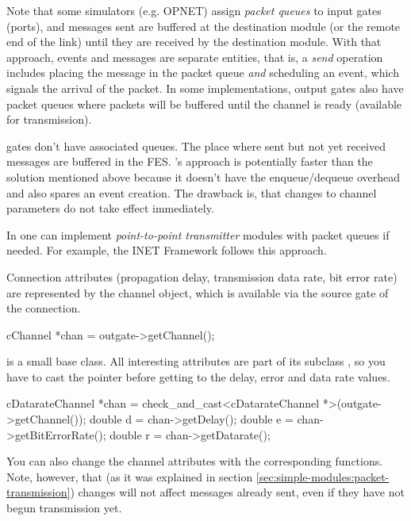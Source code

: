 Note that some simulators (e.g. OPNET) assign \textit{packet queues}
to input gates (ports), and messages sent are buffered at the
destination module (or the remote end of the link) until they are
received by the destination module. With that approach, events and
messages are separate entities, that is, a \textit{send} operation
includes placing the message in the packet queue \textit{and} scheduling
an event, which signals the arrival of the packet. In some implementations,
output gates also have packet queues where packets will be buffered until
the channel is ready (available for transmission).

{\opp} gates don't have associated queues. The place
where sent but not yet received messages are buffered in the
FES.  {\opp}'s approach is potentially faster
than the solution mentioned above because it doesn't have the
enqueue/dequeue overhead and also spares an event creation. The
drawback is, that changes to channel parameters do not take effect
immediately.

In {\opp} one can implement \textit{point-to-point transmitter} modules
with packet queues if needed. For example, the INET Framework
follows this approach.





Connection attributes (propagation delay, transmission data rate,
bit error rate) are represented by the channel object, which
is available via the source gate of the connection.

\begin{cpp}
cChannel *chan = outgate->getChannel();
\end{cpp}

 is a small base class. All interesting attributes are
part of its subclass , so you have to cast the pointer
before getting to the delay, error and data rate values.

\begin{cpp}
cDatarateChannel *chan = check_and_cast<cDatarateChannel *>(outgate->getChannel());
double d = chan->getDelay();
double e = chan->getBitErrorRate();
double r = chan->getDatarate();
\end{cpp}

You can also change the channel attributes with the corresponding
 functions. Note, however, that (as it was explained in
section \ref{sec:simple-modules:packet-transmission})
changes will not affect messages already sent, even if they have not
begun transmission yet.




